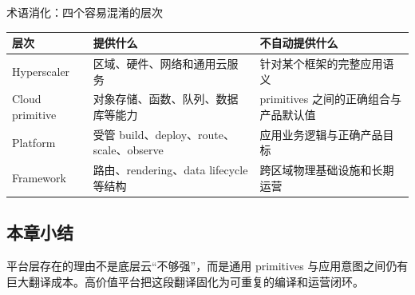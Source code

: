 \begin{knowledgebox}{术语消化：四个容易混淆的层次}
\begin{tabularx}{\textwidth}{L{0.20\textwidth}>{\raggedright\arraybackslash}X>{\raggedright\arraybackslash}X}
\toprule
层次 & 提供什么 & 不自动提供什么 \\
\midrule
Hyperscaler & 区域、硬件、网络和通用云服务 & 针对某个框架的完整应用语义 \\
Cloud primitive & 对象存储、函数、队列、数据库等能力 & primitives 之间的正确组合与产品默认值 \\
Platform & 受管 build、deploy、route、scale、observe & 应用业务逻辑与正确产品目标 \\
Framework & 路由、rendering、data lifecycle 等结构 & 跨区域物理基础设施和长期运营 \\
\bottomrule
\end{tabularx}
\end{knowledgebox}

\subsection{本章小结}

平台层存在的理由不是底层云“不够强”，而是通用 primitives 与应用意图之间仍有巨大翻译成本。高价值平台把这段翻译固化为可重复的编译和运营闭环。

